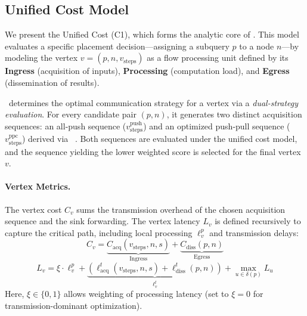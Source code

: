 
\subsection{Unified Cost Model}
\label{sec:unified_cost_framework}

We present the Unified Cost  (C1), which forms the analytic core of \we.
This model evaluates a specific placement decision—assigning a subquery $p$ to a node $n$—by modeling the vertex $v = (p, n, v_{\text{steps}})$ as a flow processing unit defined by its \textbf{Ingress} (acquisition of inputs), \textbf{Processing} (computation load), and \textbf{Egress} (dissemination of results).

\we~determines the optimal communication strategy for a vertex via a \emph{dual-strategy evaluation}. For every candidate pair $(p, n)$, it generates two distinct acquisition sequences: an all-push sequence ($v_{\text{steps}}^{\text{push}}$) and an optimized push-pull sequence ($v_{\text{steps}}^{\text{ppc}}$) derived via \prepp~\cite{PushPullSamira}. Both sequences are evaluated under the unified cost model, and the sequence yielding the lower weighted score is selected for the final vertex $v$.

\paragraph{Vertex Metrics.}
The vertex cost $C_v$ sums the transmission overhead of the chosen acquisition sequence and the sink forwarding. The vertex latency $L_v$ is defined recursively to capture the critical path, including local processing $\ell^p_v$ and transmission delays:
\begin{equation}\label{eq:vertex_cost}
    C_v = \underbrace{C_{\text{acq}}(v_{\text{steps}}, n, s)}_{\text{Ingress}} + \underbrace{C_{\text{diss}}(p, n)}_{\text{Egress}}
\end{equation}
\begin{equation}\label{eq:vertex_latency}
    L_v = \xi \cdot \ell^p_v + \underbrace{\left(\ell^t_{\text{acq}}(v_{\text{steps}}, n, s) + \ell^t_{\text{diss}}(p, n)\right)}_{\ell^t_v} + \max_{u \in \delta(p)} L_u
\end{equation}
Here, $\xi \in \{0,1\}$ allows weighting of processing latency (set to $\xi=0$ for transmission-dominant optimization).


